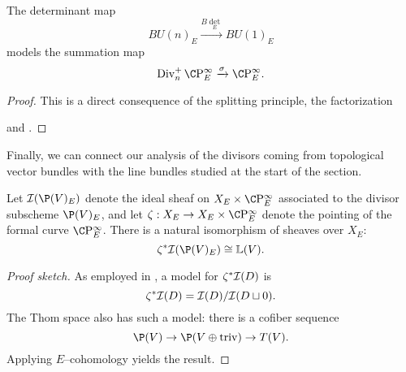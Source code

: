 \begin{corollary}\label{BdetCorollary}
The determinant map \[BU(n)_E \xrightarrow{B\det_E} BU(1)_E\] models the summation map \[\Div^+_n \CP^\infty_E \xrightarrow{\sigma} \CP^\infty_E.\]
\end{corollary}
\begin{proof}
This is a direct consequence of the splitting principle, the factorization
\begin{center}
\end{center}
and .
\end{proof}

Finally, we can connect our analysis of the divisors coming from topological vector bundles with the line bundles studied at the start of the section.
\begin{lemma}
Let \(\sheaf I(\P(V)_E)\) denote the ideal sheaf on \(X_E \times \CP^\infty_E\) associated to the divisor subscheme \(\P(V)_E\), and let \(\zeta: X_E \to X_E \times \CP^\infty_E\) denote the pointing of the formal curve \(\CP^\infty_E\).  There is a natural isomorphism of sheaves over \(X_E\): \[\zeta^* \sheaf I(\P(V)_E) \cong \ThomSheaf{V}.\]
\end{lemma}
\begin{proof}[Proof sketch]
As employed in , a model for $\zeta^* \mathcal{I}(D)$ is \[\zeta^* \mathcal{I}(D) = \mathcal{I}(D) / \mathcal{I}(D \sqcup 0).\]  The Thom space also has such a model: there is a cofiber sequence \[\P(V) \to \P(V \oplus \mathrm{triv}) \to T(V).\]  Applying $E$--cohomology yields the result.
\end{proof}

